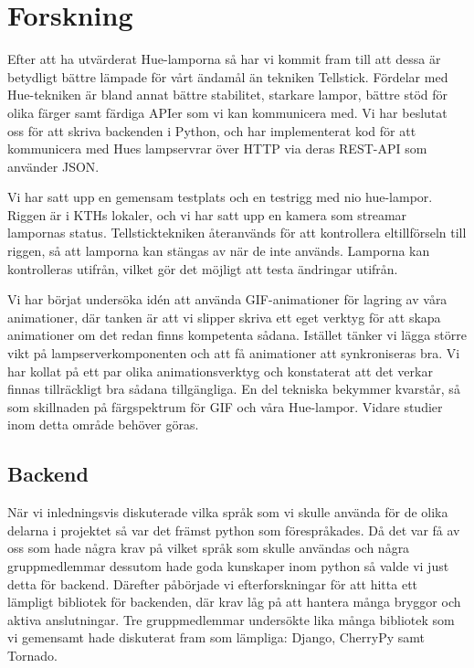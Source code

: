 \documentclass[a4paper,11pt]{article}
\begin{document}
\section{Forskning}

  Efter att ha utvärderat Hue-lamporna så har vi kommit fram till att dessa är
  betydligt bättre lämpade för vårt ändamål än tekniken Tellstick.  Fördelar
  med Hue-tekniken är bland annat bättre stabilitet, starkare lampor, bättre
  stöd för olika färger samt färdiga APIer som vi kan kommunicera med.  Vi har
  beslutat oss för att skriva backenden i Python, och har implementerat kod
  för att kommunicera med Hues lampservrar över HTTP via deras REST-API som
  använder JSON.

  Vi har satt upp en gemensam testplats och en testrigg med nio hue-lampor.
  Riggen är i KTHs lokaler, och vi har satt upp en kamera som streamar
  lampornas status.  Tellsticktekniken återanvänds för att kontrollera
  eltillförseln till riggen, så att lamporna kan stängas av när de inte
  används.  Lamporna kan kontrolleras utifrån, vilket gör det möjligt att
  testa ändringar utifrån.

  Vi har börjat undersöka idén att använda GIF-animationer för lagring av våra
  animationer, där tanken är att vi slipper skriva ett eget verktyg för att
  skapa animationer om det redan finns kompetenta sådana.  Istället tänker vi
  lägga större vikt på lampserverkomponenten och att få animationer att
  synkroniseras bra.  Vi har kollat på ett par olika animationsverktyg och
  konstaterat att det verkar finnas tillräckligt bra sådana tillgängliga.  En
  del tekniska bekymmer kvarstår, så som skillnaden på färgspektrum för GIF
  och våra Hue-lampor.  Vidare studier inom detta område behöver göras.

\subsection{Backend}

   När vi inledningsvis diskuterade vilka språk som vi skulle använda för de
   olika delarna i projektet så var det främst python som förespråkades.
   Då det var få av oss som hade några krav på vilket språk som skulle
   användas och några gruppmedlemmar dessutom hade goda kunskaper inom python
   så valde vi just detta för backend. Därefter påbörjade vi efterforskningar
   för att hitta ett lämpligt bibliotek för backenden, där krav låg på att
   hantera många bryggor och aktiva anslutningar.
   Tre gruppmedlemmar undersökte lika många bibliotek som vi gemensamt hade
   diskuterat fram som lämpliga: Django, CherryPy samt Tornado.
\end{document}
